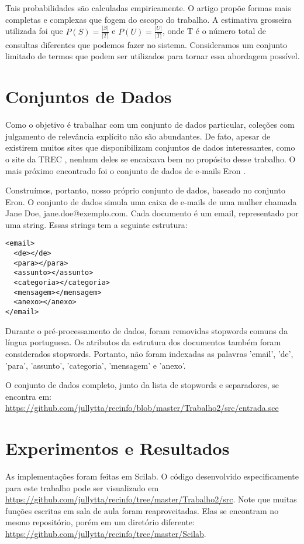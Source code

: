 \documentclass{svproc}
\begin{document}
Tais probabilidades são calculadas empiricamente. O artigo propõe formas mais completas e complexas que fogem do escopo do
trabalho. A estimativa grosseira utilizada foi que $P(S) = \frac{|S|}{|T|}$ e $P(U) = \frac{|U|}{|T|}$, onde T é o número
total de consultas diferentes que podemos fazer no sistema. Consideramos um conjunto limitado de termos que podem ser
utilizados para tornar essa abordagem possível.


\section{Conjuntos de Dados}
Como o objetivo é trabalhar com um conjunto de dados particular, coleções com julgamento de relevância explícito não são
abundantes. De fato, apesar de existirem muitos sites que disponibilizam conjuntos de dados interessantes, como o site da
TREC \cite{trec}, nenhum deles se encaixava bem no propósito desse trabalho. O mais próximo encontrado foi o 
conjunto de dados de e-mails Eron \cite{eron}.

Construímos, portanto, nosso próprio conjunto de dados, baseado no conjunto Eron. O conjunto de dados simula uma caixa de
e-mails de uma mulher chamada Jane Doe, jane.doe@exemplo.com. Cada documento é um email, representado por uma string.
Essas strings tem a seguinte estrutura:

\begin{verbatim}
<email>
  <de></de>
  <para></para>
  <assunto></assunto>
  <categoria></categoria>
  <mensagem></mensagem>
  <anexo></anexo>
</email>
\end{verbatim}

Durante o pré-processamento de dados, foram removidas stopwords comuns da língua portuguesa. Os atributos da estrutura 
dos documentos também foram considerados stopwords. Portanto, não foram indexadas as palavras 'email', 'de',
'para', 'assunto', 'categoria', 'mensagem' e 'anexo'.

O conjunto de dados completo, junto da lista de stopwords e separadores, se encontra em: 
\url{https://github.com/jullytta/recinfo/blob/master/Trabalho2/src/entrada.sce}


\section{Experimentos e Resultados}
As implementações foram feitas em Scilab. O código desenvolvido especificamente para este trabalho pode ser visualizado em 
\url{https://github.com/jullytta/recinfo/tree/master/Trabalho2/src}.
Note que muitas funções escritas em sala de aula foram reaproveitadas. Elas se encontram no mesmo repositório, porém em um
diretório diferente: \url{https://github.com/jullytta/recinfo/tree/master/Scilab}.
\end{document}
